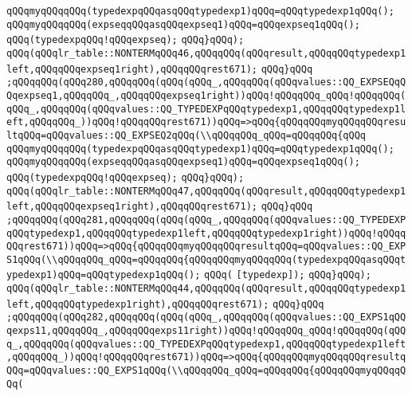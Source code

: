 \verb|qQQqmyqQQqqQQq(typedexpqQQqasqQQqtypedexp1)qQQq=qQQqtypedexp1qQQq();|\newline
\verb|qQQqmyqQQqqQQq(expseqqQQqasqQQqexpseq1)qQQq=qQQqexpseq1qQQq();|\newline
\verb|qQQq(typedexpqQQq!qQQqexpseq);|\newline
\verb|qQQq}qQQq);|\newline
\verb|qQQq(qQQqlr_table::NONTERMqQQq46,qQQqqQQq(qQQqresult,qQQqqQQqtypedexp1left,qQQqqQQqexpseq1right),qQQqqQQqrest671);|\newline
\verb|qQQq}qQQq|\newline
\verb|;qQQqqQQq(qQQq280,qQQqqQQq(qQQq(qQQq_,qQQqqQQq(qQQqvalues::QQ_EXPSEQqQQqexpseq1,qQQqqQQq_,qQQqqQQqexpseq1right))qQQq!qQQqqQQq_qQQq!qQQqqQQq(qQQq_,qQQqqQQq(qQQqvalues::QQ_TYPEDEXPqQQqtypedexp1,qQQqqQQqtypedexp1left,qQQqqQQq_))qQQq!qQQqqQQqrest671))qQQq=>qQQq{qQQqqQQqmyqQQqqQQqresultqQQq=qQQqvalues::QQ_EXPSEQ2qQQq(\\qQQqqQQq_qQQq=qQQqqQQq{qQQq|\newline
\verb|qQQqmyqQQqqQQq(typedexpqQQqasqQQqtypedexp1)qQQq=qQQqtypedexp1qQQq();|\newline
\verb|qQQqmyqQQqqQQq(expseqqQQqasqQQqexpseq1)qQQq=qQQqexpseq1qQQq();|\newline
\verb|qQQq(typedexpqQQq!qQQqexpseq);|\newline
\verb|qQQq}qQQq);|\newline
\verb|qQQq(qQQqlr_table::NONTERMqQQq47,qQQqqQQq(qQQqresult,qQQqqQQqtypedexp1left,qQQqqQQqexpseq1right),qQQqqQQqrest671);|\newline
\verb|qQQq}qQQq|\newline
\verb|;qQQqqQQq(qQQq281,qQQqqQQq(qQQq(qQQq_,qQQqqQQq(qQQqvalues::QQ_TYPEDEXPqQQqtypedexp1,qQQqqQQqtypedexp1left,qQQqqQQqtypedexp1right))qQQq!qQQqqQQqrest671))qQQq=>qQQq{qQQqqQQqmyqQQqqQQqresultqQQq=qQQqvalues::QQ_EXPS1qQQq(\\qQQqqQQq_qQQq=qQQqqQQq{qQQqqQQqmyqQQqqQQq(typedexpqQQqasqQQqtypedexp1)qQQq=qQQqtypedexp1qQQq();|\newline
\verb|qQQq(|\newline
\verb|[typedexp]);|\newline
\verb|qQQq}qQQq);|\newline
\verb|qQQq(qQQqlr_table::NONTERMqQQq44,qQQqqQQq(qQQqresult,qQQqqQQqtypedexp1left,qQQqqQQqtypedexp1right),qQQqqQQqrest671);|\newline
\verb|qQQq}qQQq|\newline
\verb|;qQQqqQQq(qQQq282,qQQqqQQq(qQQq(qQQq_,qQQqqQQq(qQQqvalues::QQ_EXPS1qQQqexps11,qQQqqQQq_,qQQqqQQqexps11right))qQQq!qQQqqQQq_qQQq!qQQqqQQq(qQQq_,qQQqqQQq(qQQqvalues::QQ_TYPEDEXPqQQqtypedexp1,qQQqqQQqtypedexp1left,qQQqqQQq_))qQQq!qQQqqQQqrest671))qQQq=>qQQq{qQQqqQQqmyqQQqqQQqresultqQQq=qQQqvalues::QQ_EXPS1qQQq(\\qQQqqQQq_qQQq=qQQqqQQq{qQQqqQQqmyqQQqqQQq(|\newline

